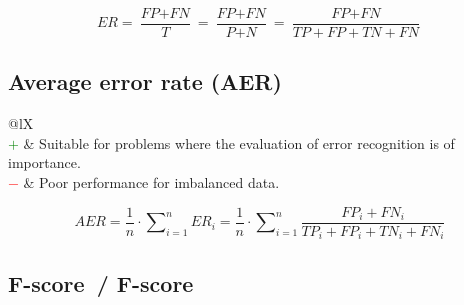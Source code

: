 \documentclass{article}
\begin{document}
\begin{equation}
    \textit{ER} = \dfrac{\textit{FP} + \textit{FN}}{\textit{T}} = \dfrac{\textit{FP} + \textit{FN}}{\textit{P} + \textit{N}} = \dfrac{\textit{FP} + \textit{FN}}{\textit{TP} + \textit{FP} + \textit{TN} + \textit{FN}}
%
    \label{equation:ER}
\end{equation}


\subsection[Average error rate (AER)]{Average error rate (AER) \cite{hamamoto1998gabor, han2016variable}}

\begin{table}[H]\centering
    \begin{tabularx}{\textwidth}{@{}lX}
         \\
        \textcolor{Green}{$+$} & Suitable for problems where the evaluation of error recognition is of importance. \\
        \textcolor{Red}{$-$}   & Poor performance for imbalanced data.
    \end{tabularx}
\end{table}

\begin{equation}
    \textit{AER} = \dfrac{1}{n} \cdot \sum\nolimits_{i = 1}^n \textit{ER}_i = \dfrac{1}{n} \cdot \sum\nolimits_{i = 1}^n \dfrac{\textit{FP}_i + \textit{FN}_i}{\textit{TP}_i + \textit{FP}_i + \textit{TN}_i + \textit{FN}_i}
%
    \label{equation:AER}
\end{equation}


\subsection[F-score~/ F\textbeta-score]{F-score~/ F\textbeta-score \cite{van2004geometry, taha2015metrics}}
\end{document}
